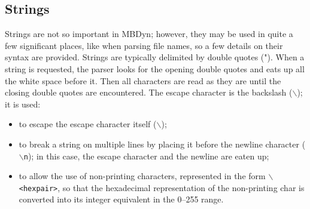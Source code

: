 \subsection{Strings}
Strings are not so important in MBDyn; however, they may be used
in quite a few significant places, like when parsing file names,
so a few details on their syntax are provided.
Strings are typically delimited by double quotes (").
When a string is requested, the parser looks for the opening 
double quotes and eats up all the white space before it.
Then all characters are read as they are until the closing 
double quotes are encountered.
The escape character is the backslash ($\backslash$); it is used:
\begin{itemize}
	\item to escape the escape character itself ($\backslash$);
	\item to break a string on multiple lines by placing it
		before the newline character (\texttt{$\backslash$n}); in this case,
		the escape character and the newline are eaten up;
	\item to allow the use of non-printing characters,
		represented in the form \texttt{$\backslash$<hexpair>},
		so that the hexadecimal representation of the
		non-printing char is converted into its integer
		equivalent in the 0--255 range.
\end{itemize}



